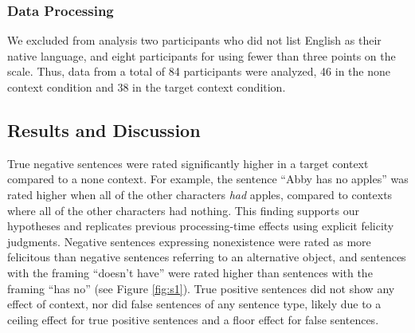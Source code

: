 \documentclass[10pt,letterpaper]{article}
\begin{document}
\subsubsection{Data Processing}

We excluded from analysis two participants who did not list English as their native language, and  eight participants for using fewer than three points on the scale.  Thus, data from a total of 84 participants were analyzed, 46 in the none context condition and 38 in the target context condition.  

\subsection{Results and Discussion}

True negative sentences were rated significantly higher in a target context compared to a none context. For example, the sentence ``Abby has no apples'' was rated higher when all of the other characters \emph{had} apples, compared to contexts where all of the other characters had nothing. This finding supports our hypotheses and replicates previous processing-time effects using explicit felicity judgments.  Negative sentences expressing nonexistence were rated as more felicitous than negative sentences referring to an alternative object, and sentences with the framing ``doesn't have'' were rated higher than sentences with the framing ``has no'' (see Figure \ref{fig:s1}). True positive sentences did not show any effect of context, nor did false sentences of any sentence type, likely due to a ceiling effect for true positive sentences and a floor effect for false sentences.  

\end{document}
